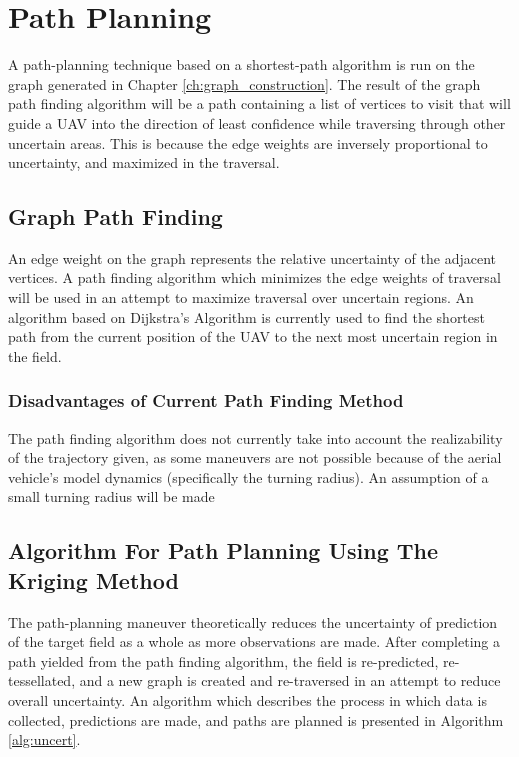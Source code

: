 \chapter{Path Planning}
A path-planning technique based on a shortest-path algorithm is run on the graph generated in Chapter \ref{ch:graph_construction}. The result of the graph path finding algorithm will be a path containing a list of vertices to visit that will guide a UAV into the direction of least confidence while traversing through other uncertain areas. This is because the edge weights are inversely proportional to uncertainty, and maximized in the traversal. 

\section{Graph Path Finding}
An edge weight on the graph represents the relative uncertainty of the adjacent vertices. A path finding algorithm which minimizes the edge weights of traversal will be used in an attempt to maximize traversal over uncertain regions. An algorithm based on Dijkstra's Algorithm is currently used to find the shortest path from the current position of the UAV to the next most uncertain region in the field. 

\subsection{Disadvantages of Current Path Finding Method}
The path finding algorithm does not currently take into account the realizability of the trajectory given, as some maneuvers are not possible because of the aerial vehicle's model dynamics (specifically the turning radius). An assumption of a small turning radius will be made

\section{Algorithm For Path Planning Using The Kriging Method}
The path-planning maneuver theoretically reduces the uncertainty of prediction of the target field as a whole as more observations are made. After completing a path yielded from the path finding algorithm, the field is re-predicted, re-tessellated, and a new graph is created and re-traversed in an attempt to reduce overall uncertainty. An algorithm which describes the process in which data is collected, predictions are made, and paths are planned is presented in Algorithm \ref{alg:uncert}.

